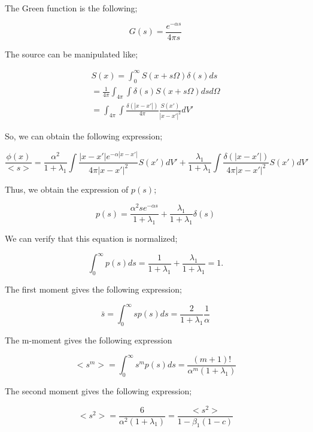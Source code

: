 \documentclass[preprint,12pt]{elsarticle}
\newcommand{\bl}{\big<}
\newcommand{\bg}{\big>}
\begin{document}
The Green function is the following;

\begin{equation}
G(s) = \frac{e^{-\alpha s}}{4 \pi s}
\end{equation}

The source can be manipulated like;

\begin{multline}
S(x) = \int_0^\infty S(x+s\Omega)\delta(s) ds \\
	 = \frac{1}{4\pi} \int_{4\pi} \int \delta(s) S(x+s\Omega)dsd\Omega \\
	 = \int_{4\pi} \int \frac{\delta(|x-x'|)}{4\pi}\frac{S(x')}{|x-x'|^2}dV'
\end{multline}

So, we can obtain the following expression;

\begin{equation}
\frac{\phi(x)}{\bl s \bg} = \frac{\alpha^2}{1+\lambda_1} \int \frac{|x-x'|e^{-\alpha|x-x'|}}{4\pi |x-x'|^2}S(x')dV' + \frac{\lambda_1}{1+\lambda_1} \int \frac{\delta(|x-x'|)}{4\pi |x-x'|^2}S(x')dV' 
\end{equation}

Thus, we obtain the expression of $p(s)$;

\begin{equation}
p(s) = \frac{\alpha^2 se^{-\alpha s}}{1+\lambda_1} + \frac{\lambda_1}{1+\lambda_1}\delta(s)
\end{equation}

We can verify that this equation is normalized;

\begin{equation}
\int_0^\infty p(s) ds = \frac{1}{1+\lambda_1} + \frac{\lambda_1}{1+\lambda_1} = 1.
\end{equation}

The first moment gives the following expression;

\begin{equation}
\bar{s}= \int_0^\infty sp(s)ds = \frac{2}{1+\lambda_1}\frac{1}{\alpha}
\end{equation}

The m-moment gives the following expression

\begin{equation}
\bl s^m \bg = \int_0^\infty s^m p(s) ds = \frac{(m+1)!}{\alpha^m (1+\lambda_1)}
\end{equation}

The second moment gives the following expression;

\begin{equation}
\bl s^2 \bg = \frac{6}{\alpha^2 (1+\lambda_1)} = \frac{\bl s^2 \bg}{1-\beta_1(1-c)} 
\end{equation}
\end{document}
